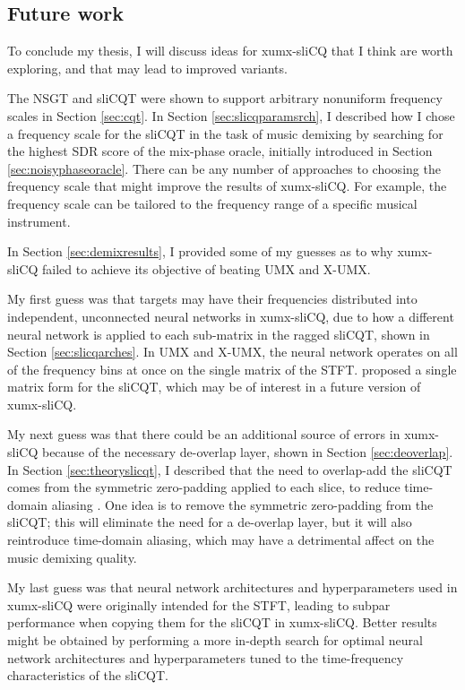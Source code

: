 \documentclass[report.tex]{subfiles}
\begin{document}
\subsection{Future work}

\begin{shaded}

To conclude my thesis, I will discuss ideas for xumx-sliCQ that I think are worth exploring, and that may lead to improved variants.

The NSGT and sliCQT were shown to support arbitrary nonuniform frequency scales in Section \ref{sec:cqt}. In Section \ref{sec:slicqparamsrch}, I described how I chose a frequency scale for the sliCQT in the task of music demixing by searching for the highest SDR score of the mix-phase oracle, initially introduced in Section \ref{sec:noisyphaseoracle}. There can be any number of approaches to choosing the frequency scale that might improve the results of xumx-sliCQ. For example, the frequency scale can be tailored to the frequency range of a specific musical instrument.

In Section \ref{sec:demixresults}, I provided some of my guesses as to why xumx-sliCQ failed to achieve its objective of beating UMX and X-UMX.

My first guess was that targets may have their frequencies distributed into independent, unconnected neural networks in xumx-sliCQ, due to how a different neural network is applied to each sub-matrix in the ragged sliCQT, shown in Section \ref{sec:slicqarches}. In UMX and X-UMX, the neural network operates on all of the frequency bins at once on the single matrix of the STFT. \textcite{variableq1} proposed a single matrix form for the sliCQT, which may be of interest in a future version of xumx-sliCQ.

My next guess was that there could be an additional source of errors in xumx-sliCQ because of the necessary de-overlap layer, shown in Section \ref{sec:deoverlap}. In Section \ref{sec:theoryslicqt}, I described that the need to overlap-add the sliCQT comes from the symmetric zero-padding applied to each slice, to reduce time-domain aliasing \parencite{slicq}. One idea is to remove the symmetric zero-padding from the sliCQT; this will eliminate the need for a de-overlap layer, but it will also reintroduce time-domain aliasing, which may have a detrimental affect on the music demixing quality.

My last guess was that neural network architectures and hyperparameters used in xumx-sliCQ were originally intended for the STFT, leading to subpar performance when copying them for the sliCQT in xumx-sliCQ. Better results might be obtained by performing a more in-depth search for optimal neural network architectures and hyperparameters tuned to the time-frequency characteristics of the sliCQT.

\end{shaded}
\end{document}
